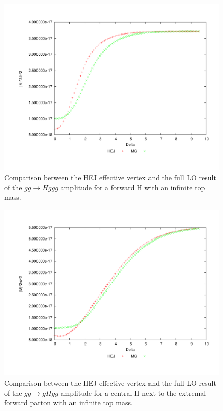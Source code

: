 \begin{figure}[t]
\centering
\includegraphics[scale=0.47]{Images/gg_nextfor.pdf}
\caption{Comparison between the HEJ effective vertex and the full LO result of the $gg \to Hggg$ amplitude for a forward H with an infinite top mass.}
\label{fig:gg_ggh_1}
\end{figure}

\begin{figure}[H]
\centering
\includegraphics[scale=0.47]{Images/gg_cen1.pdf}
\caption{Comparison between the HEJ effective vertex and the full LO result of the $gg \to gHgg$ amplitude for a central H next to the extremal forward parton with an infinite top mass.}
\label{fig:gg_ggh_2}
\end{figure}

